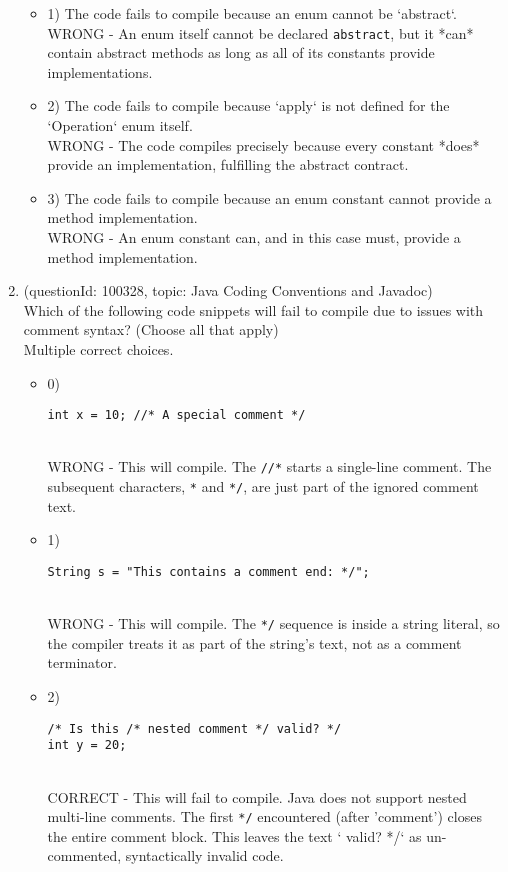\documentclass[12pt]{article}
\begin{document}
\begin{enumerate}[label=(\arabic*)]
\begin{itemize}
\item 1) The code fails to compile because an enum cannot be `abstract`.
 \\ 
WRONG - An enum itself cannot be declared \verb|abstract|, but it *can* contain abstract methods as long as all of its constants provide implementations.

\item 2) The code fails to compile because `apply` is not defined for the `Operation` enum itself.
 \\ 
WRONG - The code compiles precisely because every constant *does* provide an implementation, fulfilling the abstract contract.

\item 3) The code fails to compile because an enum constant cannot provide a method implementation.
 \\ 
WRONG - An enum constant can, and in this case must, provide a method implementation.

\end{itemize}
\item (questionId: 100328, topic: Java Coding Conventions and Javadoc) \\ 
Which of the following code snippets will fail to compile due to issues with comment syntax? (Choose all that apply)
\\ \noindent Multiple correct choices. 
\begin{itemize}
\item 0) \begin{verbatim}
int x = 10; //* A special comment */
\end{verbatim}
 \\ 
WRONG - This will compile. The \verb|//*| starts a single-line comment. The subsequent characters, \verb|*| and \verb|*/|, are just part of the ignored comment text.

\item 1) \begin{verbatim}
String s = "This contains a comment end: */";
\end{verbatim}
 \\ 
WRONG - This will compile. The \verb|*/| sequence is inside a string literal, so the compiler treats it as part of the string's text, not as a comment terminator.

\item 2) \begin{verbatim}
/* Is this /* nested comment */ valid? */
int y = 20;
\end{verbatim}
 \\ 
CORRECT - This will fail to compile. Java does not support nested multi-line comments. The first \verb|*/| encountered (after 'comment') closes the entire comment block. This leaves the text ` valid? */` as un-commented, syntactically invalid code.


\end{itemize}
\end{enumerate}
\end{document}
